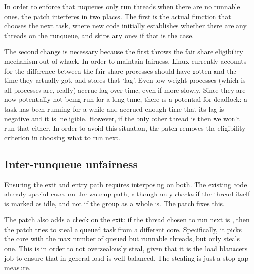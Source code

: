 In order to enforce that ruqueues only run \schedbe{} threads when there are no
runnable \schednormal{} ones, the patch interferes in two places. The first is
the actual function that chooses the next task, where new code initially
establishes whether there are any \schednormal{} threads on the runqueue, and
skips any \schedbe{} ones if that is the case. 

The second change is necessary because the first throws the fair share
eligibility mechanism out of whack. In order to maintain fairness, Linux
currently accounts for the difference between the fair share processes should
have gotten and the time they actually got, and stores that `lag'. Even low
weight processes (which is all \schedidle{} processes are, really) accrue lag
over time, even if more slowly. Since they are now potentially not being run for
a long time, there is a potential for deadlock: a \schednormal{} task has been
running for a while and accrued enough time that its lag is negative and it is
ineligible. However, if the only other thread is \schedbe{} then we won't run
that either. In order to avoid this situation, the patch removes the eligibility
criterion in choosing what to run next.


\subsection{Inter-runqueue unfairness}


Ensuring the exit and entry path requires interposing on both. The existing code
already special-cases on the wakeup path, although only checks if the thread
itself is marked as idle, and not if the group as a whole is. The patch fixes this.

The patch also adds a check on the exit: if the thread chosen to run next is
\schedbe{}, then the patch tries to steal a queued \schednormal{} task from a
different core. Specifically, it picks the core with the max number of queued
but runnable \schednormal{} threads, but only steals one. This is in order to
not overzealously steal, given that it is the load blanacers job to ensure that
in general load is well balanced. The stealing is just a stop-gap measure.


